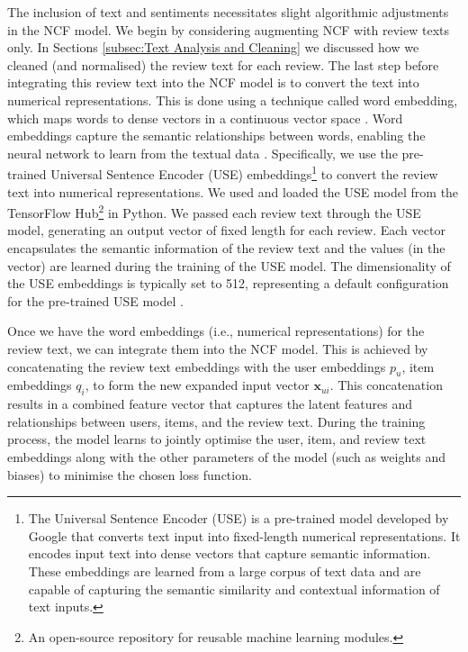 The inclusion of text and sentiments necessitates slight algorithmic adjustments in the NCF model. We begin by considering augmenting NCF with review texts only. In Sections \ref{subsec:Text Analysis and Cleaning} we discussed how we cleaned (and normalised) the review text for each review. The last step before integrating this review text into the NCF model is to convert the text into numerical representations. This is done using a technique called word embedding, which maps words to dense vectors in a continuous vector space \cite{asudani2023impact}. Word embeddings capture the semantic relationships between words, enabling the neural network to learn from the textual data \cite{mikolov2013distributed}. Specifically, we use the pre-trained Universal Sentence Encoder (USE)\cite{cer2018universal} embeddings\footnote{The Universal Sentence Encoder (USE) is a pre-trained model developed by Google that converts text input into fixed-length numerical representations. It encodes input text into dense vectors that capture semantic information. These embeddings are learned from a large corpus of text data and are capable of capturing the semantic similarity and contextual information of text inputs.} to convert the review text into numerical representations. We used and loaded the USE model from the TensorFlow Hub\footnote{An open-source repository for reusable machine learning modules.} in Python. We passed each review text through the USE model, generating an output vector of fixed length for each review. Each vector encapsulates the semantic information of the review text and the values (in the vector) are learned during the training of the USE model. The dimensionality of the USE embeddings is typically set to 512, representing a default configuration for the pre-trained USE model \cite{cer2018universal}.

Once we have the word embeddings (i.e., numerical representations) for the review text, we can integrate them into the NCF model. This is achieved by concatenating the review text embeddings with the user embeddings $p_u$, item embeddings $q_i$, to form the new expanded input vector $\mathbf{x}_{ui}$. This concatenation results in a combined feature vector that captures the latent features and relationships between users, items, and the review text. During the training process, the model learns to jointly optimise the user, item, and review text embeddings along with the other parameters of the model (such as weights and biases) to minimise the chosen loss function.

